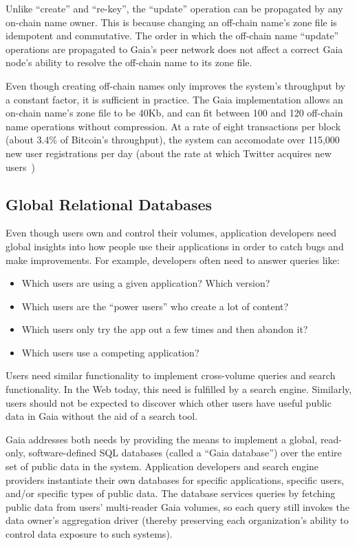 Unlike ``create'' and ``re-key'', the ``update'' operation can be propagated by
any on-chain name owner.  This is because changing an off-chain name's zone file
is idempotent and commutative.  The order in which the off-chain name ``update''
operations are propagated to Gaia's peer network does not affect a correct
Gaia node's ability to resolve the off-chain name to its zone file.

Even though creating off-chain names only improves the system's throughput by 
a constant factor, it is sufficient in practice.  The Gaia implementation
allows an on-chain name's zone file to be 40Kb, and can fit between
100 and 120 off-chain name operations without compression.
At a rate of eight transactions per block (about 3.4\% of Bitcoin's throughput),
the system can accomodate over 115,000 new user registrations
per day (about the rate at which Twitter acquires
new users~\cite{twitter-user-acquisition})  %

\subsection{Global Relational Databases}

Even though users own and control their volumes, 
application developers need global insights into how people use their
applications in order to catch bugs and make improvements. 
For example, developers often need to answer queries like:

\begin{itemize}
   \item Which users are using a given application?  Which version?
   \item Which users are the ``power users'' who create a lot of content?
   \item Which users only try the app out a few times and then abandon it?
   \item Which users use a competing application?
\end{itemize}

Users need similar functionality to implement cross-volume queries and search
functionality.  In the Web today, this need is fulfilled by a search engine.
Similarly, users should not be expected to discover which other users have
useful public data in Gaia without the aid of a search tool.

Gaia addresses both needs by providing the means to 
implement a global, read-only, software-defined SQL databases (called a ``Gaia
database'') over the entire set of public data in the system.  Application developers and search
engine providers instantiate their own databases for specific
applications, specific users, and/or specific
types of public data.  The database services queries by fetching
public data from users' multi-reader Gaia volumes, so each query still 
invokes the data owner's aggregation driver (thereby preserving each
organization's ability to control data exposure to such systems).

